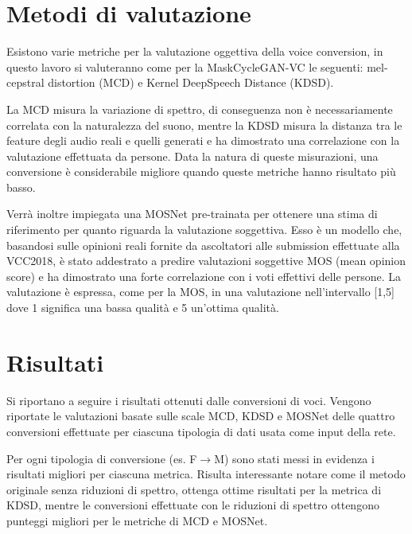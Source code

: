 		\section{Metodi di valutazione}
		Esistono varie metriche per la valutazione oggettiva della voice conversion, in questo lavoro si valuteranno come per la MaskCycleGAN-VC le seguenti: mel-cepstral distortion (MCD)\cite{mel-cepstral-distance} e Kernel DeepSpeech Distance (KDSD)\cite{kdsd}.
		
		La MCD misura la variazione di spettro, di conseguenza non è necessariamente correlata con la naturalezza del suono, mentre la KDSD misura la distanza tra le feature degli audio reali e quelli generati e ha dimostrato una correlazione con la valutazione effettuata da persone.
		Data la natura di queste misurazioni, una conversione è considerabile migliore quando queste metriche hanno risultato più basso.
		
		Verrà inoltre impiegata una MOSNet\cite{mosnet} pre-trainata per ottenere una stima di riferimento per quanto riguarda la valutazione soggettiva. Esso è un modello che, basandosi sulle opinioni reali fornite da ascoltatori alle submission effettuate alla VCC2018, è stato addestrato a predire valutazioni soggettive MOS (mean opinion score) e ha dimostrato una forte correlazione con i voti effettivi delle persone. La valutazione è espressa, come per la MOS, in una valutazione nell'intervallo [1,5] dove 1 significa una bassa qualità e 5 un'ottima qualità.
		
		\section{Risultati}
		Si riportano a seguire i risultati ottenuti dalle conversioni di voci.
		Vengono riportate le valutazioni basate sulle scale MCD, KDSD e MOSNet delle quattro conversioni effettuate per ciascuna tipologia di dati usata come input della rete.
		
		Per ogni tipologia di conversione (es. F$\rightarrow$M) sono stati messi in evidenza i risultati migliori per ciascuna metrica. Risulta interessante notare come il metodo originale \cite{MaskCyclegan-VC} senza riduzioni di spettro, ottenga ottime risultati per la metrica di KDSD, mentre le conversioni effettuate con le  riduzioni di spettro ottengono punteggi migliori per le metriche di MCD e MOSNet.
		
		
